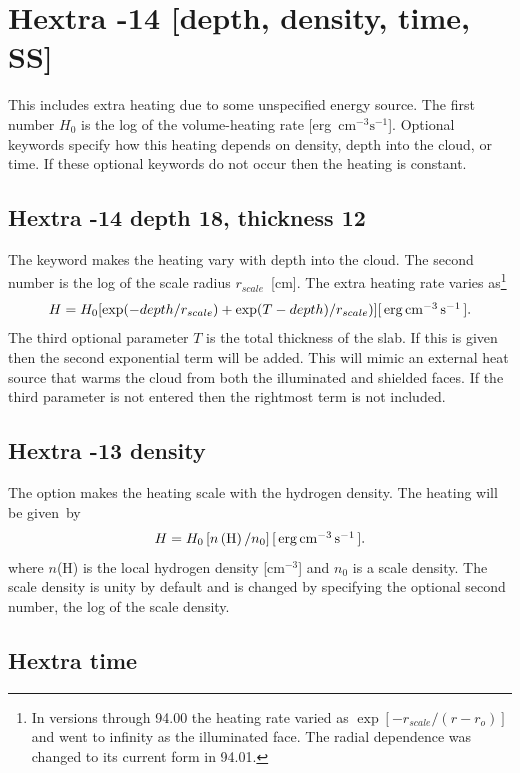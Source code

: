 \section{Hextra -14 [depth, density, time, SS]}

This includes extra heating due to some unspecified energy source.
The
first number $H_0$ is the log of the volume-heating rate
[erg~cm$^{-3}\mathrm{s}^{-1}$].
Optional keywords specify how this heating depends on density,
depth into the cloud, or time.
If these optional keywords do not occur then the heating
is constant.

\subsection{Hextra -14 depth 18, thickness 12}

The keyword  makes the heating vary with depth
into the cloud.
The
second number is the log of the scale radius $r_{scale}$~[cm].
The extra heating
rate varies as\footnote{In versions through 94.00 the heating rate
varied as
$\exp[-r_{scale}/(r-r_o)]$ and went to infinity as the illuminated face.  The radial
dependence was changed to its current form in 94.01.}
\begin{equation}
H = H_0 [\exp ( - depth/r_{scale} ) + \exp (T - depth)/r_{scale} )]
 [\ergpccmps ].%
\end{equation}
The third optional parameter $T$ is the total thickness of the slab.
If this
is given then the second exponential term will be added.
This will mimic
an external heat source that warms the cloud from both the illuminated and
shielded faces.
If the third parameter is not entered then the rightmost
term is not included.

\subsection{Hextra -13 density }

The  option makes the heating scale with the
hydrogen density.
The heating will be given~by
\begin{equation}
H = H_0 \left[ {n\left( \mathrm{H} \right)/n_0 } \right]
[\mbox{${\rm\thinspace erg}{\rm\thinspace cm}^{-3}{\rm\thinspace s}^{-1}\,$} ].
\end{equation}
where $n$(H) is the local hydrogen density [cm$^{-3}$]
and $n_0$ is a scale density.
The scale density is unity by default and is changed by specifying the
optional second number, the log of the scale density.

\subsection{Hextra time}

